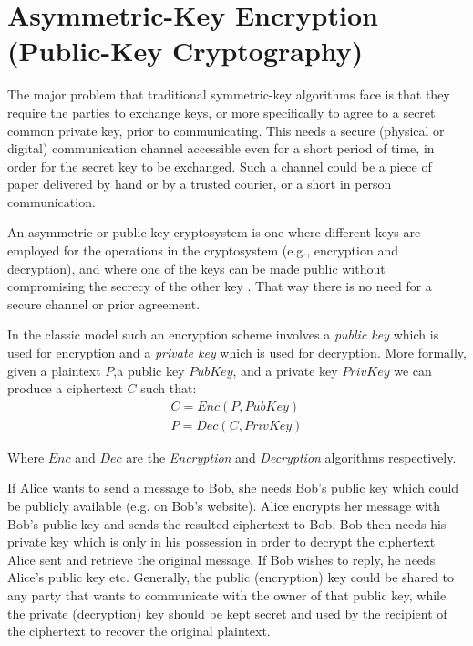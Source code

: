 \section{Asymmetric-Key Encryption (Public-Key Cryptography)}\label{s:public-key-encryption}
The major problem that traditional symmetric-key algorithms face is that they require the parties to exchange keys, or more specifically to agree to a secret common private key, prior to communicating.
This needs a secure (physical or digital) communication channel accessible even for a short period of time, in order for the secret key to be exchanged. Such a channel could be a piece of paper delivered by hand or by a trusted courier, or a short in person communication.

An asymmetric or public-key cryptosystem is one where different keys are employed for the operations in the cryptosystem (e.g., encryption and decryption), and where one of the keys can be made public without compromising the secrecy of the other key \cite{Kaliski2011}. That way there is no need for a secure channel or prior agreement.

In the classic model such an encryption scheme involves a \textit{public key} which is used for encryption and a \textit{private key} which is used for decryption.
More formally, given a plaintext $P$,a public key $PubKey$, and a private key $PrivKey$ we can produce a ciphertext $C$ such that:
\begin{equation}
  \label{eq:public-key-encryption}
  \begin{aligned}
    C = Enc(P, PubKey)\\
    P = Dec(C, PrivKey)
  \end{aligned}
  \end{equation}

Where $Enc$ and $Dec$ are the \textit{Encryption} and \textit{Decryption} algorithms respectively.

If Alice wants to send a message to Bob, she needs Bob's public key which could be publicly available (e.g. on Bob's website).
Alice encrypts her message with Bob's public key and sends the resulted ciphertext to Bob. Bob then needs his private key which is only in his possession in order to decrypt the ciphertext Alice sent and retrieve the original message.
If Bob wishes to reply, he needs Alice's public key etc.
Generally, the public (encryption) key could be shared to any party that wants to communicate with the owner of that public key, while the private (decryption) key should be kept secret and used by the recipient of the ciphertext to recover the original plaintext.


